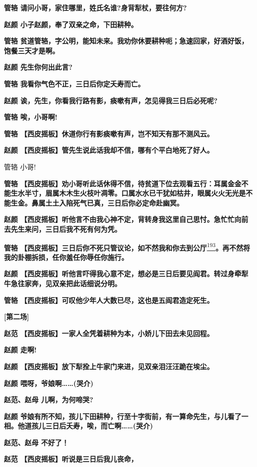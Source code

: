 \textbf{管辂 请问小哥，家住哪里，姓氏名谁?身背犁杖，要往何方?}

\textbf{赵颜 小子赵颜，奉了双亲之命，下田耕种。}

\textbf{管辂
贫道管辂，字公明，能知未来。我劝你休要耕种呃；急速回家，好酒好饭，饱餐三天才是啊。}

\textbf{赵颜 先生你何出此言?}

\textbf{管辂 我看你气色不正，三日后你定夭寿而亡。}

\textbf{赵颜 诶，先生，你看我行路有影，痰嗽有声，怎见得我三日后必死呢?}

\textbf{管辂 唉，小哥啊!}

\textbf{管辂 【西皮摇板】休道你行有影痰嗽有声，岂不知天有那不测风云。}

\textbf{赵颜 【西皮摇板】管先生说此话我却不信，哪有个平白地死了好人。}

管辂 小哥!

\textbf{管辂
【西皮摇板】劝小哥听此话休得不信，待贫道下位去观看五行：耳属金金不能生水半寸，眉属木木生火枝叶凋零。口属水水已干犹如枯井，眼属火火无光是不能生金。鼻属土土入陷死气已真，三日后你必定命赴幽冥。}

\textbf{赵颜
【西皮摇板】听他言不由我心神不定，背转身我这里自己思忖。急忙忙向前去先生来问，三日后我不死有何为凭。}

\textbf{管辂
【西皮摇板】三日后你不死只管议论，如不然我和你去到公厅}\protect\hyperlink{fn193}{\textsuperscript{193}}\textbf{。再不然将我的卦棚拆损，任你羞任你辱任你施行。}

\textbf{赵颜
【西皮摇板】听他言吓得我心意不定，想必是三日后要见阎君。转过身牵犁牛急往家奔，见双亲把此话细说分明。}

\textbf{管辂 【西皮摇板】可叹他少年人大数已尽，这也是五阎君造定死生。}

\textbf{{[}第二场{]}}

\textbf{赵范 【西皮摇板】一家人全凭着耕种为本，小娇儿下田去未见回程。}

\textbf{赵颜 走啊!}

\textbf{赵颜 【西皮摇板】放下犁拴上牛家门来进，见双亲泪汪汪跪在埃尘。}

\textbf{赵颜 喂呀，爷娘啊\ldots{}\ldots{}(哭介)}

\textbf{赵范、赵母 儿啊，为何啼哭?}

\textbf{赵颜
爷娘有所不知，孩儿下田耕种，行至十字街前，有一算命先生，与儿看了一相。他道孩儿三日后夭寿，唉，而亡啊\ldots{}\ldots{}(哭介)}

\textbf{赵范、赵母 不好了！}

\textbf{赵范 【西皮摇板】听说是三日后我儿丧命，}

